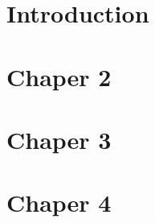 \chapter{Introduction}
\label{chap:Introduction}




\chapter{Chaper 2}
\label{chap:Chapter-2}



\chapter{Chaper 3}
\label{chap:Chapter-3}



\chapter{Chaper 4}
\label{chap:Chapter-4}







\appendix





\listoffigures
{}


\listoftables
{}


\newpage
{}
\printindex


